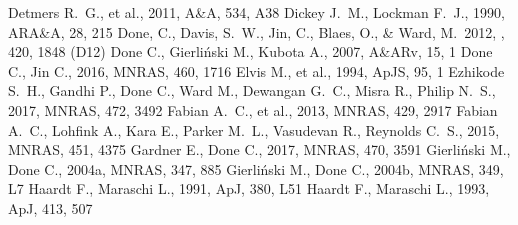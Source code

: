 \documentclass[a4paper,fleqn,usenatbib]{mnras}
\begin{document}
\begin{thebibliography}{99}
 Detmers R.~G., et al., 2011, A\&A, 534, A38 %
 Dickey J.~M., Lockman F.~J., 1990, ARA\&A, 28, 215 
 Done, C., Davis, S.~W., Jin, C., Blaes, O., \& Ward, M.\ 2012, \mnras, 420, 1848 (D12)
  Done C., Gierli{\'n}ski M., Kubota A., 2007, A\&ARv, 15, 1 
  Done C., Jin C., 2016, MNRAS, 460, 1716 
   Elvis M., et al., 1994, ApJS, 95, 1 
 Ezhikode S.~H., Gandhi P., Done C., Ward M., Dewangan G.~C., Misra R., Philip N.~S., 2017, MNRAS, 472, 3492 
 Fabian A.~C., et al., 2013, MNRAS, 429, 2917 
 Fabian A.~C., Lohfink A., Kara E., Parker M.~L., Vasudevan R., Reynolds C.~S., 2015, MNRAS, 451, 4375 
 Gardner E., Done C., 2017, MNRAS, 470, 3591 %
  Gierli{\'n}ski M., Done C., 2004a, MNRAS, 347, 885 %
  Gierli{\'n}ski M., Done C., 2004b, MNRAS, 349, L7  %
 Haardt F., Maraschi L., 1991, ApJ, 380, L51 
 Haardt F., Maraschi L., 1993, ApJ, 413, 507 

\end{thebibliography}
\end{document}
